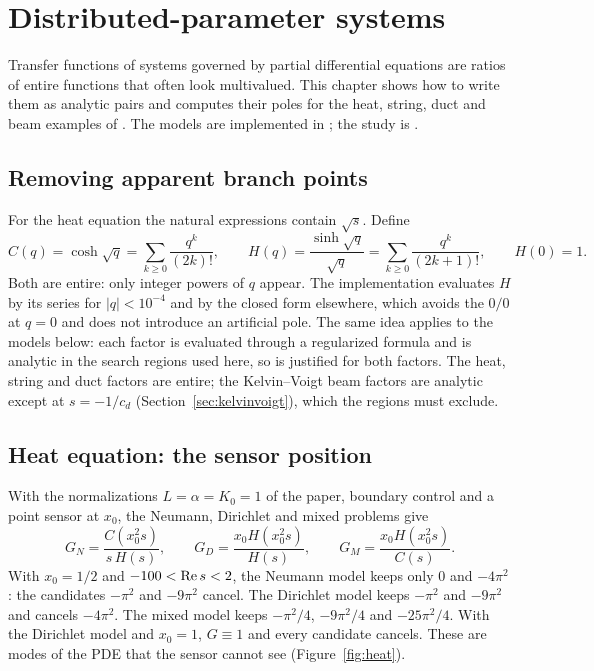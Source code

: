 \chapter{Distributed-parameter systems}\label{ch:distributed}

Transfer functions of systems governed by partial differential equations
are ratios of entire functions that often look multivalued. This chapter
shows how to write them as analytic pairs and computes their poles for the
heat, string, duct and beam examples of \citet{curtain2009}. The models are
implemented in ; the study is
.

\section{Removing apparent branch points}

For the heat equation the natural expressions contain $\sqrt s$. Define
\[
  C(q)=\cosh\sqrt q=\sum_{k\ge0}\frac{q^k}{(2k)!},\qquad
  H(q)=\frac{\sinh\sqrt q}{\sqrt q}=\sum_{k\ge0}\frac{q^k}{(2k+1)!},\qquad
  H(0)=1 .
\]
Both are entire: only integer powers of $q$ appear. The implementation
evaluates $H$ by its series for $|q|<10^{-4}$ and by the closed form
elsewhere, which avoids the $0/0$ at $q=0$ and does not introduce an
artificial pole. The same idea applies to the models below: each factor is
evaluated through a regularized formula and is analytic in the search
regions used here, so  is justified for both factors.
The heat, string and duct factors are entire; the Kelvin--Voigt beam factors
are analytic except at $s=-1/c_d$ (Section~\ref{sec:kelvinvoigt}), which the
regions must exclude.

\section{Heat equation: the sensor position}\label{sec:heat}

With the normalizations $L=\alpha=K_0=1$ of the paper, boundary control and
a point sensor at $x_0$, the Neumann, Dirichlet and mixed problems give
\[
  G_N=\frac{C(x_0^2s)}{s\,H(s)},\qquad
  G_D=\frac{x_0H(x_0^2s)}{H(s)},\qquad
  G_M=\frac{x_0H(x_0^2s)}{C(s)} .
\]
With $x_0=1/2$ and $-100<\operatorname{Re} s<2$, the Neumann model keeps only $0$ and
$-4\pi^2$: the candidates $-\pi^2$ and $-9\pi^2$ cancel. The Dirichlet
model keeps $-\pi^2$ and $-9\pi^2$ and cancels $-4\pi^2$. The mixed model
keeps $-\pi^2/4$, $-9\pi^2/4$ and $-25\pi^2/4$. With the Dirichlet model and
$x_0=1$, $G\equiv1$ and every candidate cancels. These are modes of the PDE
that the sensor cannot see (Figure~\ref{fig:heat}).

